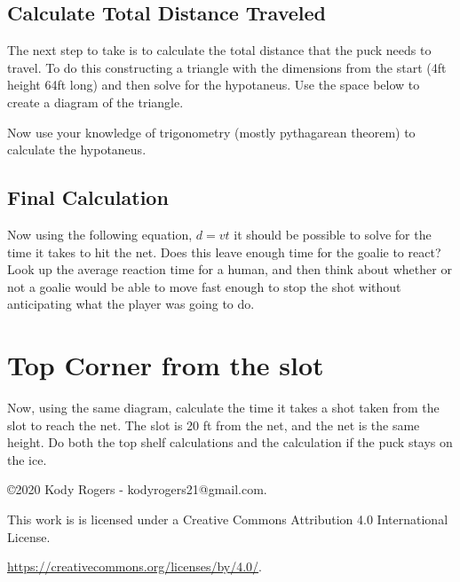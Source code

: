 \documentclass[12pt]{article}
\begin{document}
\parbox[][8cm][t]{8cm}{}

\subsection{Calculate Total Distance Traveled}
The next step to take is to calculate the total distance that the puck needs to travel. To do this constructing a triangle with the dimensions from the start (4ft height 64ft long) and then solve for the hypotaneus. Use the space below to create a diagram of the triangle.

\parbox[][7cm][t]{8cm}{}

Now use your knowledge of trigonometry (mostly pythagarean theorem) to calculate the hypotaneus.

\parbox[][8cm][t]{8cm}{}

\subsection{Final Calculation}
Now using the following equation, $d = vt$ it should be possible to solve for the time it takes to hit the net. Does this leave enough time for the goalie to react? Look up the average reaction time for a human, and then think about whether or not a goalie would be able to move fast enough to stop the shot without anticipating what the player was going to do.

\parbox[][8cm][t]{8cm}{}

\section{Top Corner from the slot}
Now, using the same diagram, calculate the time it takes a shot taken from the slot to reach the net. The slot is 20 ft from the net, and the net is the same height. Do both the top shelf calculations and the calculation if the puck stays on the ice.

\parbox[][16cm][t]{12cm}{}

\begin{flushleft}
    \copyright  2020 Kody Rogers - kodyrogers21@gmail.com.

    This work is is licensed under a Creative Commons Attribution 4.0 International License.

    \url{https://creativecommons.org/licenses/by/4.0/}.
\end{flushleft}

\end{document}
